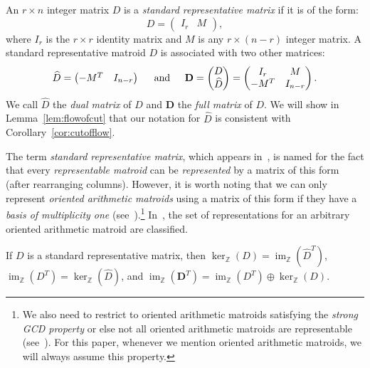 \documentclass[ALCO,ThmDefs,Unicode,epreuves]{cedram}
\newcommand{\Z}{\mathbb{Z}}
\newcommand{\D}{\mathbf{D}}
\newcommand{\what}{\widehat}
\DeclareMathOperator{\Ima}{im}
\begin{document}
\begin{defi}\label{def:standrep}
An $r \times n$ integer matrix $D$ is a \emph{standard representative matrix} if it is of the form:
\[
D = \begin{pmatrix} I_r & M\end{pmatrix},
\]
where $I_r$ is the $r \times r$ identity matrix and $M$ is any $r \times (n-r)$ integer matrix. A standard representative matroid $D$ is associated with two other matrices:
\[
\what D = \begin{pmatrix} -M^T & I_{n-r}\end{pmatrix} \hspace{.4 cm}\text{ and }\hspace{.4 cm} \D = \begin{pmatrix} D \\ \what D \end{pmatrix} = \begin{pmatrix} I_r & M\\ -M^T & I_{n-r}\end{pmatrix}.
\]
We call $\what D$ the \emph{dual matrix} of $D$ and $\D$ the \emph{full matrix} of $D$. We will show in Lemma~\ref{lem:flowofcut} that our notation for $\what D$ is consistent with Corollary~\ref{cor:cutofflow}. 
\end{defi}

\begin{rema}
The term \emph{standard representative matrix}, which appears in~\cite[Section~2.2]{Oxley}, is named for the fact that every \emph{representable matroid} can be \emph{represented} by a matrix of this form (after rearranging columns). However, it is worth noting that we can only represent \emph{oriented arithmetic matroids} using a matrix of this form if they have a \emph{basis of multiplicity one} (see~\cite[Corollary~4.3.13]{mythesis}).\footnote{We also need to restrict to oriented arithmetic matroids satisfying the \emph{strong GCD property} or else not all oriented arithmetic matroids are representable (see~\cite[Section~4.2]{mythesis}). For this paper, whenever we mention oriented arithmetic matroids, we will always assume this property.} In~\cite[Chapter~5]{mythesis}, the set of representations for an arbitrary oriented arithmetic matroid are classified. 
\end{rema}
\begin{lemma}\label{lem:flowofcut}
If $D$ is a standard representative matrix, then $\ker_\Z(D) = \Ima_\Z(\what D^T)$, $\Ima_\Z(D^T) = \ker_\Z(\what D)$, and $\Ima_\Z(\D^T) = \Ima_\Z(D^T) \oplus \ker_\Z(D)$. 
\end{lemma}
\end{document}
